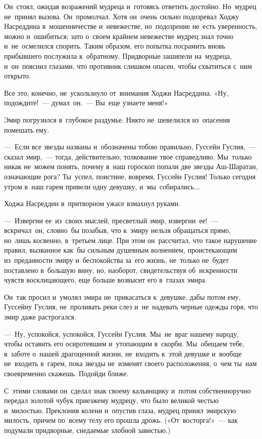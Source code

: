 \documentclass[12pt,a4paper]{book}
\begin{document}
Он~стоял, ожидая возражений мудреца и~готовясь ответить достойно. Но~мудрец не~принял вызова. Он~промолчал. Хотя он~очень сильно подозревал Ходжу Насреддина в~мошенничестве и~невежестве, но~подозрение не~есть уверенность, можно и~ошибиться; зато о~своем крайнем невежестве мудрец знал точно и~не~осмелился спорить. Таким образом, его попытка посрамить вновь прибывшего послужила к~обратному. Придворные зашипели на~мудреца, и~он~пояснил глазами, что противник слишком опасен, чтобы схватиться с~ним открыто.

Все это, конечно, не~ускользнуло от~внимания Ходжи Насреддина. «Ну, подождите!~— думал~он.~— Вы~еще узнаете меня!»

Эмир погрузился в~глубокое раздумье. Никто не~шевелился из~опасения помешать ему.

—~Если все звезды названы и~обозначены тобою правильно, Гуссейн Гуслия,~— сказал эмир,~— тогда, действительно, толкование твое справедливо. Мы~только никак не~можем понять, почему в~наш гороскоп попали две звезды Аш-Шаратан, означающие рога? Ты~успел, поистине, вовремя, Гуссейн Гуслия! Только сегодня утром в~наш гарем привели одну девушку, и~мы~собирались...

Ходжа Насреддин в~притворном ужасе взмахнул руками.

—~Извергни ее~из~своих мыслей, пресветлый эмир, извергни~ее!~— вскричал~он, словно~бы позабыв, что к~эмиру нельзя обращаться прямо, но~лишь косвенно, в~третьем лице. При этом он~рассчитал, что такое нарушение правил, вызванное как~бы сильным душевным волнением, проистекающим из~преданности эмиру и~беспокойства за~его жизнь, не~только не~будет поставлено в~большую вину, но, наоборот, свидетельствуя об~искренности чувств восклицающего, еще больше возвысит его в~глазах эмира.

Он~так просил и~умолял эмира не~прикасаться к~девушке, дабы потом ему, Гуссейну Гуслия, не~проливать реки слез и~не~надевать черные одежды горя, что эмир даже растрогался.

—~Ну, успокойся, успокойся, Гуссейн Гуслия. Мы~не~враг нашему народу, чтобы оставить его осиротевшим и~утопающим в~скорби. Мы~обещаем тебе, в~заботе о~нашей драгоценной жизни, не~входить к~этой девушке и~вообще не~входить в~гарем, пока звезды не~изменят своего расположения, о~чем ты~нам своевременно скажешь. Подойди ближе.

С~этими словами он~сделал знак своему кальянщику и~потом собственноручно передал золотой чубук приезжему мудрецу, что было великой честью и~милостью. Преклонив колени и~опустив глаза, мудрец принял эмирскую милость, причем по~всему телу его прошла дрожь. («От~восторга!»~— как подумали придворные, снедаемые злобной завистью.)
\end{document}
